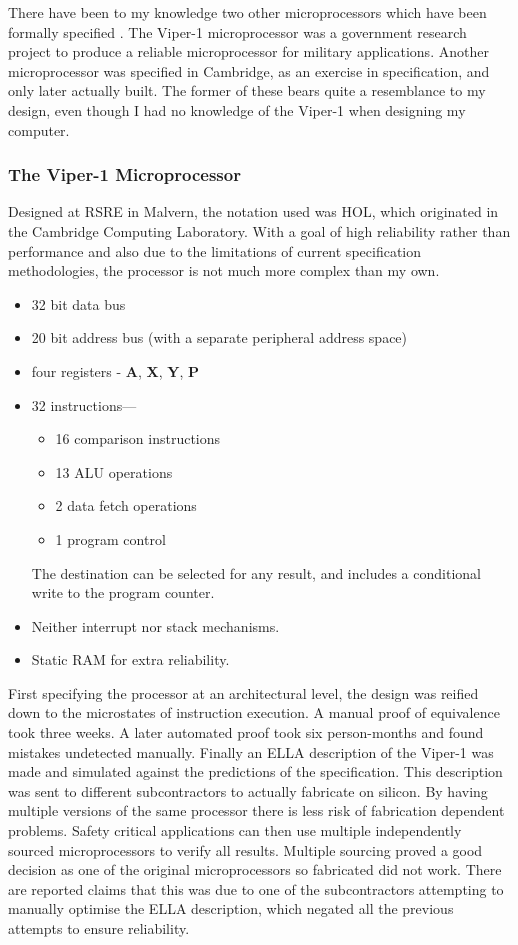 There have been to my knowledge two other microprocessors which have been formally specified \cite{birt:vlsi}. The Viper-1 microprocessor was a government research project to produce a reliable microprocessor for military applications. Another microprocessor was specified in Cambridge, as an exercise in specification, and only later actually built.
The former of these bears quite a resemblance to my design, even though I had no knowledge of the Viper-1 when designing my computer.
\subsubsection{The Viper-1 Microprocessor}
Designed at RSRE in Malvern, 
the notation used was HOL, which originated in the Cambridge Computing Laboratory. 
With a goal of high reliability rather than performance and also due to the limitations of current specification methodologies, the processor is not much more complex than my own.
\begin{itemize}
\item 
32  bit data bus
\item 20 bit address bus (with a separate peripheral address space)
\item four registers - {\bf A}, {\bf X}, {\bf Y}, {\bf P}
\item 32 instructions---
\begin{itemize}
\item
16 comparison instructions
\item 13 ALU operations
\item 2 data fetch operations
\item 1 program control
\end{itemize}
The destination can be selected for any result, and includes a conditional
write to the program counter.
\item Neither interrupt nor stack mechanisms.
\item Static RAM for extra reliability.
\end{itemize}
First specifying the processor at an architectural level, the design was reified down to the microstates of instruction execution.
A manual proof of equivalence took three weeks.  
A later automated proof took six person-months and found   mistakes
undetected manually.
Finally an ELLA description of the Viper-1 was made and simulated against the predictions of the specification. 
This description was sent to different subcontractors to actually fabricate on silicon.
By having multiple versions of the same processor there is less risk of fabrication dependent problems. 
Safety critical applications can then use multiple independently sourced microprocessors to verify all results.
Multiple sourcing proved a good decision as one of the original microprocessors so fabricated did not work. 
There are reported claims that this was due to one of the subcontractors attempting to manually optimise the ELLA description, which negated all the previous attempts to ensure reliability.

